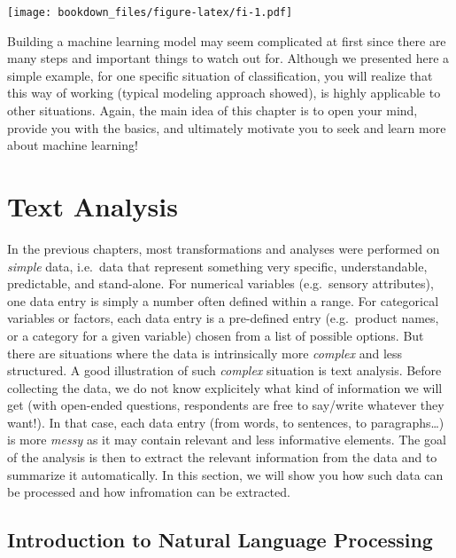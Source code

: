 \documentclass[
]{krantz}
\renewenvironment{quote}{\begin{VF}}{\end{VF}}
\begin{document}
\texttt{[image: bookdown\_files/figure-latex/fi-1.pdf]}

Building a machine learning model may seem complicated at first since there are many steps and important things to watch out for. Although we presented here a simple example, for one specific situation of classification, you will realize that this way of working (typical modeling approach showed), is highly applicable to other situations. Again, the main idea of this chapter is to open your mind, provide you with the basics, and ultimately motivate you to seek and learn more about machine learning!

\hypertarget{text-analysis}{%
\chapter{Text Analysis}\label{text-analysis}}

\begin{quote}
In the previous chapters, most transformations and analyses were performed on \emph{simple} data, i.e.~data that represent something very specific, understandable, predictable, and stand-alone. For numerical variables (e.g.~sensory attributes), one data entry is simply a number often defined within a range. For categorical variables or factors, each data entry is a pre-defined entry (e.g.~product names, or a category for a given variable) chosen from a list of possible options. But there are situations where the data is intrinsically more \emph{complex} and less structured.
A good illustration of such \emph{complex} situation is text analysis. Before collecting the data, we do not know explicitely what kind of information we will get (with open-ended questions, respondents are free to say/write whatever they want!). In that case, each data entry (from words, to sentences, to paragraphs\ldots) is more \emph{messy} as it may contain relevant and less informative elements. The goal of the analysis is then to extract the relevant information from the data and to summarize it automatically. In this section, we will show you how such data can be processed and how infromation can be extracted.
\end{quote}

\hypertarget{introduction-to-natural-language-processing}{%
\section{Introduction to Natural Language Processing}\label{introduction-to-natural-language-processing}}
\end{document}
